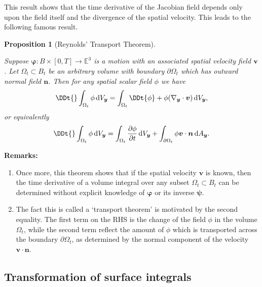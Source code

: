\documentclass[
  letterpaper,
  DIV=11,
  numbers=noendperiod]{scrreprt}
\theoremstyle{plain}
\newtheorem{proposition}{Proposition}[chapter]
\theoremstyle{remark}
\begin{document}
This result shows that the time derivative of the Jacobian field depends
only upon the field itself and the divergence of the spatial velocity.
This leads to the following famous result.

\begin{proposition}[Reynolds' Transport
Theorem]\protect\hypertarget{prp-Reynolds}{}\label{prp-Reynolds}

Suppose \({\boldsymbol{\varphi}}:B\times[0,T]\to{\mathbb{E}}^3\) is a
motion with an associated spatial velocity field \({\boldsymbol{v}}\).
Let \(\Omega_t\subset B_t\) be an arbitrary volume with boundary
\(\partial \Omega_t\) which has outward normal field
\({\boldsymbol{n}}\). Then for any spatial scalar field \(\phi\) we have
\[\DDt{}\int_{\Omega_t}\phi{\,{\mathrm{d}}V_{{\boldsymbol{y}}}}= \int_{\Omega_t}\DDt{\phi}+\phi(\nabla_{\boldsymbol{y}}\cdot{\boldsymbol{v}}){\,{\mathrm{d}}V_{{\boldsymbol{y}}}},\]
or equivalently
\[\DDt{}\int_{\Omega_t}\phi{\,{\mathrm{d}}V_{{\boldsymbol{y}}}}= \int_{\Omega_t}\frac{\partial \phi}{\partial t}{\,{\mathrm{d}}V_{{\boldsymbol{y}}}}+\int_{\partial \Omega_t}\phi {\boldsymbol{v}}\cdot{\boldsymbol{n}}{\,{\mathrm{d}}A_{{\boldsymbol{y}}}}.\]

\end{proposition}

\textbf{Remarks:}

\begin{enumerate}
\def\labelenumi{\arabic{enumi}.}
\item
  Once more, this theorem shows that if the spatial velocity
  \({\boldsymbol{v}}\) is known, then the time derivative of a volume
  integral over any subset \(\Omega_t\subset B_t\) can be determined
  without explicit knowledge of \({\boldsymbol{\varphi}}\) or its
  inverse \({\boldsymbol{\psi}}\).
\item
  The fact this is called a `transport theorem' is motivated by the
  second equality. The first term on the RHS is the change of the field
  \(\phi\) in the volume \(\Omega_t\), while the second term reflect the
  amount of \(\phi\) which is transported across the boundary
  \(\partial \Omega_t\), as determined by the normal component of the
  velocity \({\boldsymbol{v}}\cdot{\boldsymbol{n}}\).
\end{enumerate}

\subsection{Transformation of surface
integrals}\label{transformation-of-surface-integrals}
\end{document}
